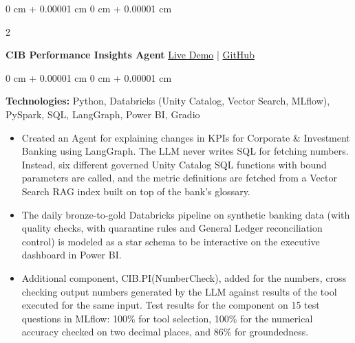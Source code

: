 \documentclass[10pt, letterpaper]{article}
\newenvironment{highlights}{
    \begin{itemize}[
        topsep=0.10 cm,
        parsep=0.10 cm,
        partopsep=0pt,
        itemsep=0pt,
        leftmargin=0 cm + 10pt
    ]
}{
    \end{itemize}
} %
\newenvironment{onecolentry}{
    \begin{adjustwidth}{
        0 cm + 0.00001 cm
    }{
        0 cm + 0.00001 cm
    }
}{
    \end{adjustwidth}
} %
\newenvironment{twocolentry}[2][]{
    \onecolentry
    \def\secondColumn{#2}
    \setcolumnwidth{\fill, 4.5 cm}
    \begin{paracol}{2}
}{
    \switchcolumn \raggedleft \secondColumn
    \end{paracol}
    \endonecolentry
} %
\begin{document}
        \begin{twocolentry}{
            \href{https://insights.inkandinfra.com}{Live Demo} |
            \href{https://github.com/hpk369/northlake-cib-insights-agent}{GitHub}
        }
            \textbf{CIB Performance Insights Agent}\end{twocolentry}
        \vspace{0.10 cm}
        \begin{onecolentry}
            \textbf{Technologies:}\> Python, Databricks (Unity Catalog, Vector Search, MLflow), PySpark, SQL, LangGraph, Power BI, Gradio
            \begin{highlights}
                \item Created an Agent for explaining changes in KPIs for Corporate \& Investment Banking using LangGraph. The LLM never writes SQL for fetching numbers. Instead, six different governed Unity Catalog SQL functions with bound parameters are called, and the metric definitions are fetched from a Vector Search RAG index built on top of the bank’s glossary.
                \item The daily bronze-to-gold Databricks pipeline on synthetic banking data (with quality checks, with quarantine rules and General Ledger reconciliation control) is modeled as a star schema to be interactive on the executive dashboard in Power BI.
                \item Additional component, CIB.PI(NumberCheck), added for the numbers, cross checking output numbers generated by the LLM against results of the tool executed for the same input. Test results for the component on 15 test questions in MLflow: 100\% for tool selection, 100\% for the numerical accuracy checked on two decimal places, and 86\% for groundedness.
            \end{highlights}
        \end{onecolentry}
\end{document}
